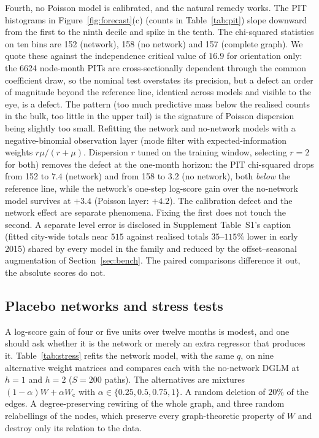 \documentclass[12pt]{article}
\theoremstyle{plain}
\theoremstyle{definition}
\theoremstyle{remark}
\newcommand{\Wc}{W_{\mathrm{c}}}
\newcommand{\PitN}{6624}
\newcommand{\PitChiNet}{152}
\newcommand{\PitChiNonet}{158}
\newcommand{\PitChiComp}{157}
\begin{document}
Fourth, no Poisson model is calibrated, and the natural remedy works. The PIT histograms in Figure~\ref{fig:forecast}(c) (counts in Table~\ref{tab:pit}) slope downward from the first to the ninth decile and spike in the tenth. The chi-squared statistics on ten bins are \PitChiNet{} (network), \PitChiNonet{} (no network) and \PitChiComp{} (complete graph). We quote these against the independence critical value of $16.9$ for orientation only: the \PitN{} node-month PITs are cross-sectionally dependent through the common coefficient draw, so the nominal test overstates its precision, but a defect an order of magnitude beyond the reference line, identical across models and visible to the eye, is a defect. The pattern (too much predictive mass below the realised counts in the bulk, too little in the upper tail) is the signature of Poisson dispersion being slightly too small. Refitting the network and no-network models with a negative-binomial observation layer (mode filter with expected-information weights $r\mu/(r+\mu)$. Dispersion $r$ tuned on the training window, selecting $r=2$ for both) removes the defect at the one-month horizon: the PIT chi-squared drops from \PitChiNet{} to $7.4$ (network) and from \PitChiNonet{} to $3.2$ (no network), both \emph{below} the reference line, while the network's one-step log-score gain over the no-network model survives at $+3.4$ (Poisson layer: $+4.2$). The calibration defect and the network effect are separate phenomena. Fixing the first does not touch the second. A separate level error is disclosed in Supplement Table~S1's caption (fitted city-wide totals near $515$ against realised totals $35$--$115\%$ lower in early 2015) shared by every model in the family and reduced by the offset--seasonal augmentation of Section~\ref{sec:bench}. The paired comparisons difference it out, the absolute scores do not.

\subsection{Placebo networks and stress tests}\label{sec:placebo}
A log-score gain of four or five units over twelve months is modest, and one should ask whether it is the network or merely an extra regressor that produces it. Table~\ref{tab:stress} refits the network model, with the same $q$, on nine alternative weight matrices and compares each with the no-network DGLM at $h=1$ and $h=2$ ($S=200$ paths). The alternatives are mixtures $(1-\alpha)W+\alpha\Wc$ with $\alpha\in\{0.25,0.5,0.75,1\}$. A random deletion of $20\%$ of the edges. A degree-preserving rewiring of the whole graph, and three random relabellings of the nodes, which preserve every graph-theoretic property of $W$ and destroy only its relation to the data.
\end{document}
